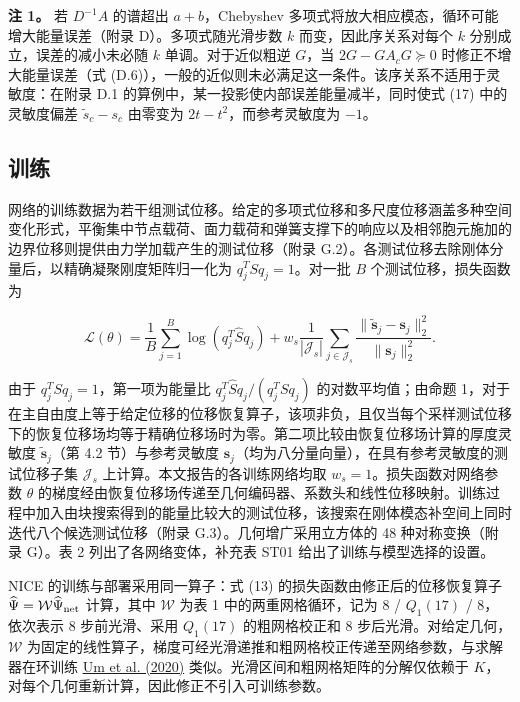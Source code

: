\documentclass[preprint,12pt,authoryear]{elsarticle}
\begin{document}
\textbf{注 1。} 若 \(D^{-1}A\) 的谱超出 \(a+b\)，Chebyshev 多项式将放大相应模态，循环可能增大能量误差（附录 D）。多项式随光滑步数 \(k\) 而变，因此序关系对每个 \(k\) 分别成立，误差的减小未必随 \(k\) 单调。对于近似粗逆 \(G\)，当 \(2G-GA_cG\succeq0\) 时修正不增大能量误差（式 (D.6)），一般的近似则未必满足这一条件。该序关系不适用于灵敏度：在附录 D.1 的算例中，某一投影使内部误差能量减半，同时使式 (17) 中的灵敏度偏差 \(\widetilde s_c-s_c\) 由零变为 \(2t-t^2\)，而参考灵敏度为 \(-1\)。

\subsection{训练}

网络的训练数据为若干组测试位移。给定的多项式位移和多尺度位移涵盖多种空间变化形式，平衡集中节点载荷、面力载荷和弹簧支撑下的响应以及相邻胞元施加的边界位移则提供由力学加载产生的测试位移（附录 G.2）。各测试位移去除刚体分量后，以精确凝聚刚度矩阵归一化为 \(q_j^TSq_j=1\)。对一批 \(B\) 个测试位移，损失函数为

\[
\mathcal L(\theta)=\frac1B\sum_{j=1}^{B}\log(q_j^T\widehat S q_j)
 +w_s\frac1{|\mathcal J_s|}\sum_{j\in\mathcal J_s}
 \frac{\|\widetilde{\boldsymbol s}_j-\boldsymbol s_j\|_2^2}{\|\boldsymbol s_j\|_2^2}.
\tag{13}
\]

由于 \(q_j^TSq_j=1\)，第一项为能量比 \(q_j^T\widehat Sq_j/(q_j^TSq_j)\) 的对数平均值；由命题 1，对于在主自由度上等于给定位移的位移恢复算子，该项非负，且仅当每个采样测试位移下的恢复位移场均等于精确位移场时为零。第二项比较由恢复位移场计算的厚度灵敏度 \(\widetilde{\boldsymbol s}_j\)（第 4.2 节）与参考灵敏度 \(\boldsymbol s_j\)（均为八分量向量），在具有参考灵敏度的测试位移子集 \(\mathcal J_s\) 上计算。本文报告的各训练网络均取 \(w_s=1\)。损失函数对网络参数 \(\theta\) 的梯度经由恢复位移场传递至几何编码器、系数头和线性位移映射。训练过程中加入由块搜索得到的能量比较大的测试位移，该搜索在刚体模态补空间上同时迭代八个候选测试位移（附录 G.3）。几何增广采用立方体的 48 种对称变换（附录 G）。表 2 列出了各网络变体，补充表 ST01 给出了训练与模型选择的设置。

NICE 的训练与部署采用同一算子：式 (13) 的损失函数由修正后的位移恢复算子 \(\widehat\Psi=\mathcal W\widehat\Psi_{\rm net}\) 计算，其中 \(\mathcal W\) 为表 1 中的两重网格循环，记为 8 / \(Q_1(17)\) / 8，依次表示 8 步前光滑、采用 \(Q_1(17)\) 的粗网格校正和 8 步后光滑。对给定几何，\(\mathcal W\) 为固定的线性算子，梯度可经光滑递推和粗网格校正传递至网络参数，与求解器在环训练 \href{https://proceedings.neurips.cc/paper/2020/hash/43e4e6a6f341e00671e123714de019a8-Abstract.html}{Um et al. (2020)} 类似。光滑区间和粗网格矩阵的分解仅依赖于 \(K\)，对每个几何重新计算，因此修正不引入可训练参数。
\end{document}
